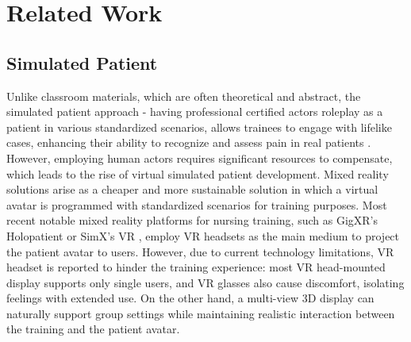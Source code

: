 \section{Related Work}
\subsection{Simulated Patient}
Unlike classroom materials, which are often theoretical and abstract, the simulated patient approach - having professional certified actors roleplay as a patient in various standardized scenarios, allows trainees to engage with lifelike cases, enhancing their ability to recognize and assess pain in real patients \cite{ma2023standardized}. However, employing human actors requires significant resources to compensate, which leads to the rise of virtual simulated patient development. Mixed reality solutions arise as a cheaper and more sustainable solution in which a virtual avatar is programmed with standardized scenarios for training purposes. Most recent notable mixed reality platforms for nursing training, such as GigXR's Holopatient \cite{kang2023effect} or SimX's VR \cite{shah2023orchestrating}, employ VR headsets as the main medium to project the patient avatar to users. However, due to current technology limitations, VR headset is reported to hinder the training experience: most VR head-mounted display supports only single users, and VR glasses also cause discomfort, isolating feelings with extended use. On the other hand, a multi-view 3D display can naturally support group settings while maintaining realistic interaction between the training and the patient avatar.